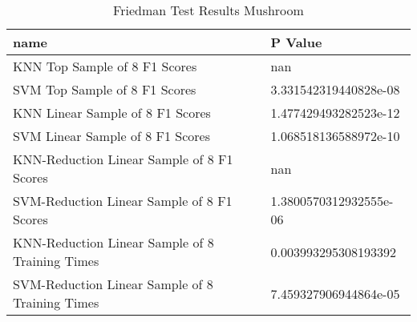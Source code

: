 \begin{table}
\centering
\caption{Friedman Test Results Mushroom}
\label{tab:friedman_test_results_mushroom}
\begin{tabular}{ll}
\toprule
name & P Value \\
\midrule
KNN Top Sample of 8 F1 Scores & nan \\
SVM Top Sample of 8 F1 Scores & 3.331542319440828e-08 \\
KNN Linear Sample of 8 F1 Scores & 1.477429493282523e-12 \\
SVM Linear Sample of 8 F1 Scores & 1.068518136588972e-10 \\
KNN-Reduction Linear Sample of 8 F1 Scores & nan \\
SVM-Reduction Linear Sample of 8 F1 Scores & 1.3800570312932555e-06 \\
KNN-Reduction Linear Sample of 8 Training Times & 0.003993295308193392 \\
SVM-Reduction Linear Sample of 8 Training Times & 7.459327906944864e-05 \\
\bottomrule
\end{tabular}
\end{table}
